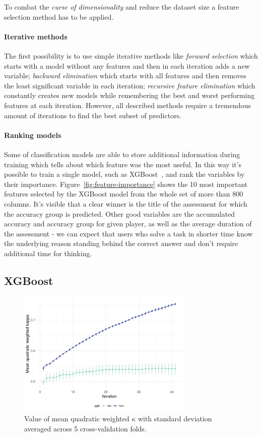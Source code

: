 \documentclass[fleqn,10pt]{SelfArx} %
\begin{document}
To combat the \textit{curse of dimensionality} and reduce the dataset size a feature selection method has to be applied.
\paragraph{Iterative methods}
The first possibility is to use simple iterative methods like \textit{forward selection} which starts with a model without any features and then in each iteration adds a new variable; \textit{backward elimination} which starts with all features and then removes the least significant variable in each iteration; \textit{recursive feature elimination} which constantly creates new models while remembering the best and worst performing features at each iteration.
However, all described methods require a tremendous amount of iterations to find the best subset of predictors.
\paragraph{Ranking models}
Some of classification models are able to store additional information during training which tells about which feature was the most useful.
In this way it's possible to train a single model, such as XGBoost~\cite{xgboost}, and rank the variables by their importance.
Figure~\ref{fig:feature-importance} shows the 10 most important features selected by the XGBoost model from the whole set of more than 800 columns.
It's visible that a clear winner is the title of the assessment for which the accuracy group is predicted.
Other good variables are the accumulated accuracy and accuracy group for given player, as well as the average duration of the assessment - we can expect that users who solve a task in shorter time know the underlying reason standing behind the correct answer and don't require additional time for thinking.

\subsection{XGBoost}

\begin{figure}
    \centering
    \includegraphics[width=\linewidth,height=6cm]{images/xgboost_cv.png}
    \caption{Value of mean quadratic weighted $\kappa$ with standard deviation averaged across 5 cross-validation folds.}
    \label{fig:xgboost-cv}
\end{figure}
\end{document}
